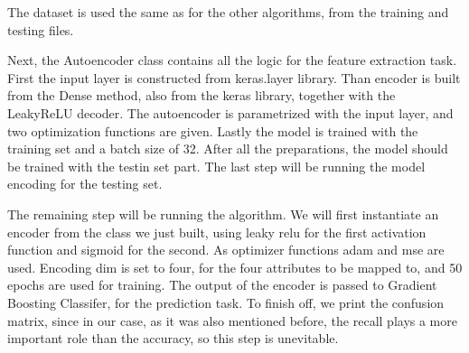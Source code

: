 \noindent The dataset is used the same as for the other algorithms, from the training and testing files.

\vspace{0.5cm}

\vspace{0.5cm}

\noindent Next, the Autoencoder class contains all the logic for the feature extraction task. First the input layer is constructed from keras.layer library. Than encoder is built from the Dense method, also from the keras library, together with the LeakyReLU decoder. The autoencoder is parametrized with the input layer, and two optimization functions are given. Lastly the model is trained with the training set and a batch size of 32. After all the preparations, the model should be trained with the testin set part. The last step will be running the model encoding for the testing set.

\vspace{0.5cm}

\vspace{0.5cm}

\noindent

\noindent The remaining step will be running the algorithm.
We will first instantiate an encoder from the class we just built, using leaky relu for the first activation function and sigmoid for the second.
As optimizer functions adam and mse are used.
Encoding dim is set to four, for the four attributes to be mapped to, and 50 epochs are used for training.
The output of the encoder is passed to Gradient Boosting Classifer, for the prediction task.
To finish off, we print the confusion matrix, since in our case, as it was also mentioned before, the recall plays a more important role than the accuracy, so this step is unevitable.\\

\vspace{0.5cm}

\vspace{0.5cm}

